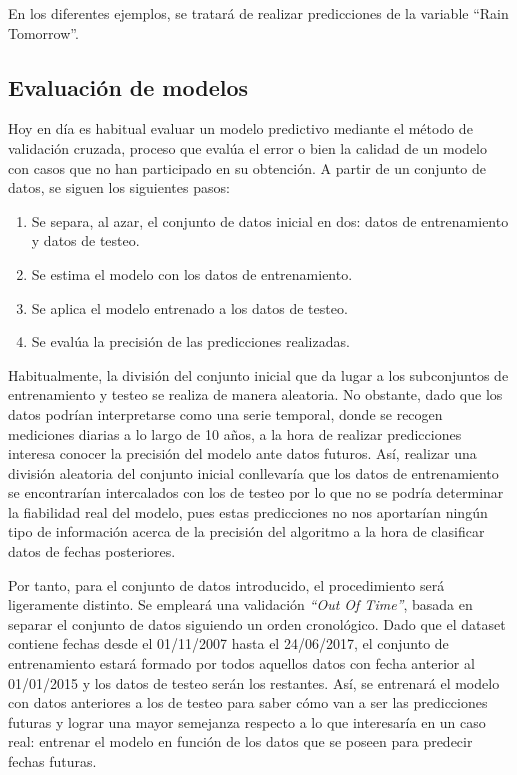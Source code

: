 \documentclass[12pt,twoside]{article}
\begin{document}
En los diferentes ejemplos, se tratará de realizar predicciones de la variable ``Rain Tomorrow''.


\subsection{Evaluación de modelos} \label{subsec:Metodología}

Hoy en día es habitual evaluar un modelo predictivo mediante el método de validación cruzada, proceso que evalúa el error o bien la calidad de un modelo con casos que no han participado en su obtención. A partir de un conjunto de datos, se siguen los siguientes pasos:

\begin{enumerate}
\item Se separa, al azar, el conjunto de datos inicial en dos: datos de entrenamiento y datos de testeo.
\item Se estima el modelo con los datos de entrenamiento.
\item Se aplica el modelo entrenado a los datos de testeo.
\item Se evalúa la precisión de las predicciones realizadas.
\end{enumerate}

Habitualmente, la división del conjunto inicial que da lugar a los subconjuntos de entrenamiento y testeo se realiza de manera aleatoria. No obstante, dado que los datos podrían interpretarse como una serie temporal, donde se recogen mediciones diarias a lo largo de 10 años, a la hora de realizar predicciones interesa conocer la precisión del modelo ante datos futuros.  Así, realizar una división aleatoria del conjunto inicial conllevaría que los datos de entrenamiento se encontrarían intercalados con los de testeo por lo que no se podría determinar la fiabilidad real del modelo, pues estas predicciones no nos aportarían ningún tipo de información acerca de la precisión del algoritmo a la hora de clasificar datos de fechas posteriores.

Por tanto, para el conjunto de datos introducido, el procedimiento será ligeramente distinto. Se empleará una validación \textit{``Out Of Time''}, basada en separar el conjunto de datos siguiendo un orden cronológico. Dado que el dataset contiene fechas desde el 01/11/2007 hasta el 24/06/2017, el conjunto de entrenamiento estará formado por todos aquellos datos con fecha anterior al 01/01/2015 y los datos de testeo serán los restantes. Así, se entrenará el modelo con datos anteriores a los de testeo para saber cómo van a ser las predicciones futuras y lograr una mayor semejanza respecto a lo que interesaría en un caso real: entrenar el modelo en función de los datos que se poseen para predecir fechas futuras.
\end{document}
